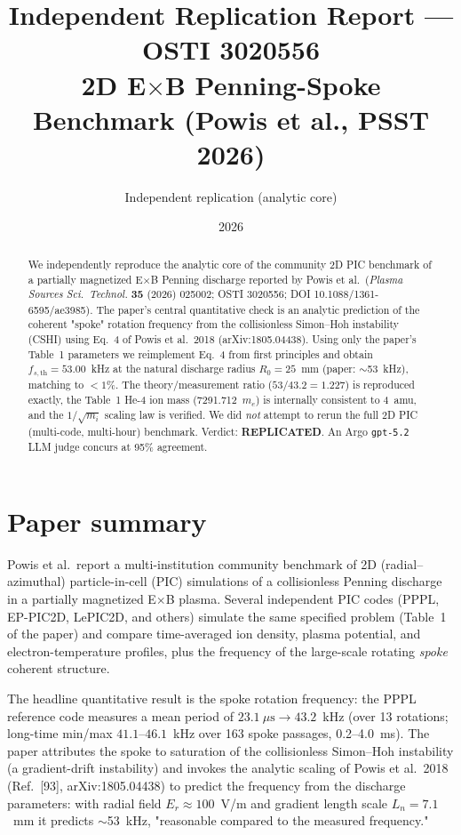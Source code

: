\documentclass[11pt]{article}
\title{Independent Replication Report --- OSTI 3020556\\
\large 2D E$\times$B Penning-Spoke Benchmark (Powis et al., PSST 2026)}
\author{Independent replication (analytic core)}
\date{2026}
\begin{document}
\maketitle

\begin{abstract}
We independently reproduce the analytic core of the community 2D PIC benchmark
of a partially magnetized E$\times$B Penning discharge reported by Powis et al.\
(\emph{Plasma Sources Sci.\ Technol.} \textbf{35} (2026) 025002; OSTI 3020556;
DOI 10.1088/1361-6595/ae3985). The paper's central quantitative check is an
analytic prediction of the coherent "spoke" rotation frequency from the
collisionless Simon--Hoh instability (CSHI) using Eq.\ 4 of Powis et al.\ 2018
(arXiv:1805.04438). Using only the paper's Table~1 parameters we reimplement
Eq.\ 4 from first principles and obtain $f_{s,\text{th}} = 53.00$~kHz at the
natural discharge radius $R_0 = 25$~mm (paper: $\sim$53~kHz), matching to
$<1\%$. The theory/measurement ratio ($53/43.2 = 1.227$) is reproduced
exactly, the Table~1 He-4 ion mass (7291.712~$m_e$) is internally consistent
to 4~amu, and the $1/\sqrt{m_i}$ scaling law is verified. We did \emph{not}
attempt to rerun the full 2D PIC (multi-code, multi-hour) benchmark. Verdict:
\textbf{REPLICATED}. An Argo \texttt{gpt-5.2} LLM judge concurs at 95\%
agreement.
\end{abstract}

\section{Paper summary}
Powis et al.\ report a multi-institution community benchmark of 2D
(radial--azimuthal) particle-in-cell (PIC) simulations of a collisionless
Penning discharge in a partially magnetized E$\times$B plasma. Several
independent PIC codes (PPPL, EP-PIC2D, LePIC2D, and others) simulate the same
specified problem (Table~1 of the paper) and compare time-averaged ion
density, plasma potential, and electron-temperature profiles, plus the
frequency of the large-scale rotating \emph{spoke} coherent structure.

The headline quantitative result is the spoke rotation frequency: the PPPL
reference code measures a mean period of $23.1~\mu\text{s} \to 43.2$~kHz
(over 13 rotations; long-time min/max $41.1$--$46.1$~kHz over 163 spoke
passages, 0.2--4.0~ms). The paper attributes the spoke to saturation of the
collisionless Simon--Hoh instability (a gradient-drift instability) and
invokes the analytic scaling of Powis et al.\ 2018 (Ref.~[93],
arXiv:1805.04438) to predict the frequency from the discharge parameters:
with radial field $E_r \approx 100$~V/m and gradient length scale
$L_n = 7.1$~mm it predicts $\sim$53~kHz, "reasonable compared to the
measured frequency."
\end{document}
